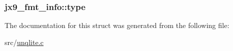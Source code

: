\hypertarget{structjx9__fmt__info_a58c2539137a7cc1445a733026f0603f2}{
\subsubsection[{type}]{ jx9\-\_\-fmt\-\_\-info\-::type}}\label{d2/da5/structjx9__fmt__info_a58c2539137a7cc1445a733026f0603f2}


The documentation for this struct was generated from the following file\-:\begin{DoxyCompactItemize}
\item 
src/\hyperlink{unqlite_8c}{unqlite.\-c}\end{DoxyCompactItemize}
